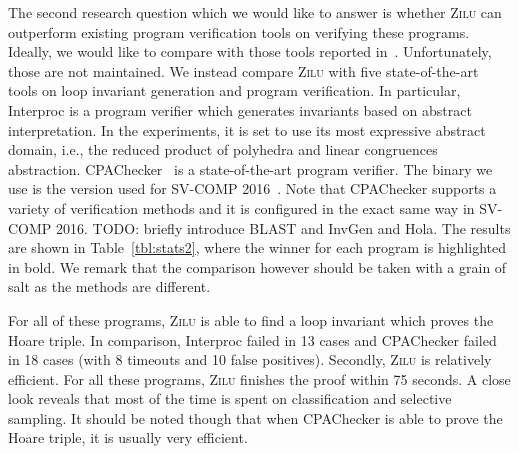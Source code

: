 The second research question which we would like to answer is whether \textsc{Zilu} can outperform existing program verification tools on verifying these programs. Ideally, we would like to compare with those tools reported in~\cite{sharma2012interpolants,sharma2013verification,DBLP:conf/esop/0001GHALN13,sharma2014invariant}. Unfortunately, those are not maintained. We instead compare \textsc{Zilu} with five state-of-the-art tools on loop invariant generation and program verification. In particular, Interproc is a program verifier which generates invariants based on abstract interpretation. In the experiments, it is set to use its most expressive abstract domain, i.e., the reduced product of polyhedra and linear congruences abstraction. CPAChecker~\cite{DBLP:conf/cav/BeyerK11} is a state-of-the-art program verifier. The binary we use is the version used for SV-COMP 2016~\cite{Dirk:SVCOMP:2016}. Note that CPAChecker supports a variety of verification methods and it is configured in the exact same way in SV-COMP 2016. TODO: briefly introduce BLAST and InvGen and Hola. 
The results are shown in Table~\ref{tbl:stats2}, where the winner for each program is highlighted in bold. We remark that the comparison however should be taken with a grain of salt as the methods are different.

For all of these programs, \textsc{Zilu} is able to find a loop invariant which proves the Hoare triple. In comparison, Interproc failed in 13 cases and CPAChecker failed in 18 cases (with 8 timeouts and 10 false positives). Secondly, \textsc{Zilu} is relatively efficient. For all these programs, \textsc{Zilu} finishes the proof within 75 seconds. A close look reveals that most of the time is spent on classification and selective sampling. It should be noted though that when CPAChecker is able to prove the Hoare triple, it is usually very efficient.
